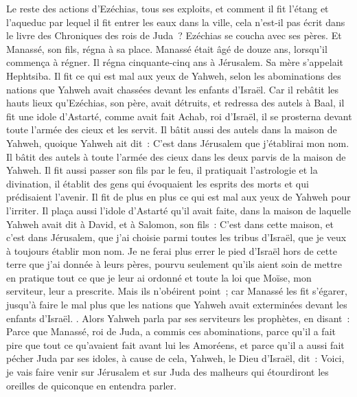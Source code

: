 \begin{multicols}{2}
Le reste des actions d'Ezéchias, tous ses exploits, et comment il fit l'étang et l'aqueduc par lequel il fit entrer les eaux dans la ville, cela n'est-il pas écrit dans le livre des Chroniques des rois de Juda~?
Ezéchias se coucha avec ses pères. Et Manassé, son fils, régna à sa place.
\VerseOne{}Manassé était âgé de douze ans, lorsqu'il commença à régner. Il régna cinquante-cinq ans à Jérusalem. Sa mère s'appelait Hephtsiba.
Il fit ce qui est mal aux yeux de Yahweh, selon les abominations des nations que Yahweh avait chassées devant les enfants d'Israël.
Car il rebâtit les hauts lieux qu'Ezéchias, son père, avait détruits, et redressa des autels à Baal, il fit une idole d'Astarté, comme avait fait Achab, roi d'Israël, il se prosterna devant toute l'armée des cieux et les servit.
Il bâtit aussi des autels dans la maison de Yahweh, quoique Yahweh ait dit~: C'est dans Jérusalem que j'établirai mon nom.
Il bâtit des autels à toute l'armée des cieux dans les deux parvis de la maison de Yahweh.
Il fit aussi passer son fils par le feu, il pratiquait l'astrologie et la divination, il établit des gens qui évoquaient les esprits des morts et qui prédisaient l'avenir. Il fit de plus en plus ce qui est mal aux yeux de Yahweh pour l'irriter.
Il plaça aussi l'idole d'Astarté qu'il avait faite, dans la maison de laquelle Yahweh avait dit à David, et à Salomon, son fils~: C'est dans cette maison, et c'est dans Jérusalem, que j'ai choisie parmi toutes les tribus d'Israël, que je veux à toujours établir mon nom.
Je ne ferai plus errer le pied d'Israël hors de cette terre que j'ai donnée à leurs pères, pourvu seulement qu'ils aient soin de mettre en pratique tout ce que je leur ai ordonné et toute la loi que Moïse, mon serviteur, leur a prescrite.
Mais ils n'obéirent point~; car Manassé les fit s'égarer, jusqu'à faire le mal plus que les nations que Yahweh avait exterminées devant les enfants d'Israël.
.
Alors Yahweh parla par ses serviteurs les prophètes, en disant~:
Parce que Manassé, roi de Juda, a commis ces abominations, parce qu'il a fait pire que tout ce qu'avaient fait avant lui les Amoréens, et parce qu'il a aussi fait pécher Juda par ses idoles,
à cause de cela, Yahweh, le Dieu d'Israël, dit~: Voici, je vais faire venir sur Jérusalem et sur Juda des malheurs qui étourdiront les oreilles de quiconque en entendra parler.

\end{multicols}
